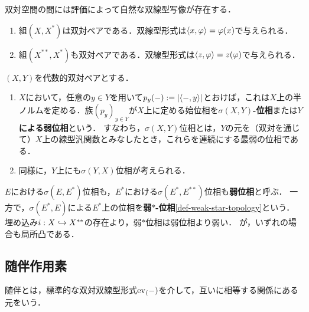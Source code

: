 \documentclass[uplatex,dvipdfmx]{jsreport}
\begin{document}
\begin{example}[線型空間の自然なペアリング]\label{exp-dual-pair}
    双対空間の間には評価によって自然な双線型写像が存在する．
    \begin{enumerate}
        \item 組$(X,X^*)$は双対ペアである．双線型形式は$\langle x,\varphi\rangle=\varphi(x)$で与えられる．
        \item 組$(X^{**},X^*)$も双対ペアである．双線型形式は$\langle z,\varphi\rangle=z(\varphi)$で与えられる．
    \end{enumerate}
\end{example}

\begin{definition}[代数的双対が定める位相]
    $(X,Y)$を代数的双対ペアとする．
    \begin{enumerate}
        \item $X$において，任意の$y\in Y$を用いて$p_y(-):=\lvert\langle-,y\rangle\rvert$とおけば，これは$X$上の半ノルムを定める．族$(p_y)_{y\in Y}$が$X$上に定める始位相を\textbf{$\sigma(X,Y)$-位相}または\textbf{$Y$による弱位相}という．
        すなわち，$\sigma(X,Y)$位相とは，$Y$の元を（双対を通じて）$X$上の線型汎関数とみなしたとき，これらを連続にする最弱の位相である．
        \item 同様に，$Y$上にも$\sigma(Y,X)$位相が考えられる．
    \end{enumerate}
\end{definition}

\begin{example}[線型空間の自然な誘導位相]
    $E$における$\sigma(E,E^*)$位相も，$E^*$における$\sigma(E^*,E^{**})$位相も\textbf{弱位相}と呼ぶ．
    一方で，$\sigma(E^*,E)$による$E^*$上の位相を\textbf{弱$*$-位相}\ref{def-weak-star-topology}という．
    埋め込み$i:X\hookrightarrow X^{**}$の存在より，弱$*$位相は弱位相より弱い．
    が，いずれの場合も局所凸である．
\end{example}

\subsection{随伴作用素}

\begin{tcolorbox}[colframe=ForestGreen, colback=ForestGreen!10!white,breakable,colbacktitle=ForestGreen!40!white,coltitle=black,fonttitle=\bfseries\sffamily,
title=]
    随伴とは，標準的な双対双線型形式$\mathrm{ev}_(-)$を介して，互いに相等する関係にある元をいう．
\end{tcolorbox}
\end{document}
